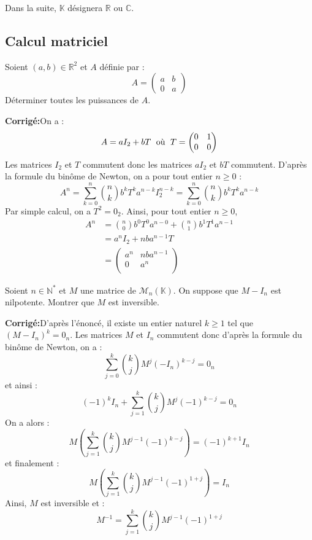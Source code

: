 \documentclass[a4paper,twoside,french,11pt]{VcCours}
\newcommand{\corr}{\textbf{Corrigé:}}
\begin{document}

\tableofcontents
\separationTitre

Dans la suite, $\mathbb{K}$ désignera $\mathbb{R}$ ou $\mathbb{C}$.


\subsection{\large Calcul matriciel}

\begin{Exercice}{} Soient $(a,b) \in \mathbb{R}^2$ et $A$ définie par :
$$ A = \begin{pmatrix}
a & b \\
0  & a
\end{pmatrix}$$ 
Déterminer toutes les puissances de $A$.
\end{Exercice}

\corr On a :
$$ A = a I_2 + b T \; \hbox{ où } \; T = \begin{pmatrix}
0 & 1 \\
0 & 0
\end{pmatrix}$$
Les matrices $I_2$ et $T$ commutent donc les matrices $a I_2$ et $bT$ commutent. D'après la formule du binôme de Newton, on a pour tout entier $n \geq 0$ :
$$ A^n = \sum_{k=0}^n \binom{n}{k} b^k T^k a^{n-k} I_2^{n-k} = \sum_{k=0}^n \binom{n}{k} b^k T^k a^{n-k} $$
Par simple calcul, on a $T^2 = 0_2$. Ainsi, pour tout entier $n \geq 0$,
\begin{align*}
 A^n  &= \binom{n}{0} b^0 T^0 a^{n-0} + \binom{n}{1} b^1 T^1 a^{n-1} \\
 & = a^n I_2 + nba^{n-1} T \\
 & = \begin{pmatrix}
 a^n & nba^{n-1} \\
 0 & a^n \\
 \end{pmatrix}
 \end{align*}
 
 

\begin{Exercice}{} Soient $n \in \mathbb{N}^*$ et $M$ une matrice de $\mathcal{M}_n(\mathbb{K})$. On suppose que $M-I_n$ est nilpotente. Montrer que $M$ est inversible.
\end{Exercice}

\corr D'après l'énoncé, il existe un entier naturel $k \geq 1$ tel que $(M-I_n)^k = 0_n$. Les matrices $M$ et $I_n$ commutent donc d'après la formule du binôme de Newton, on a :
$$ \sum_{j=0}^k \binom{k}{j} M^j (-I_n)^{k-j} = 0_n$$
et ainsi :
$$ (-1)^k I_n + \sum_{j=1}^k \binom{k}{j} M^j (-1)^{k-j} = 0_n$$
On a alors :
$$ M \left(\sum_{j=1}^k \binom{k}{j} M^{j-1} (-1)^{k-j} \right) = (-1)^{k+1} I_n$$
et finalement :
$$ M \left(\sum_{j=1}^k \binom{k}{j} M^{j-1} (-1)^{1+j} \right)= I_n$$
Ainsi, $M$ est inversible et :
$$ M^{-1} = \sum_{j=1}^k \binom{k}{j} M^{j-1} (-1)^{1+j} $$
\end{document}
